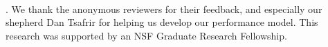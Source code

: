 ~\\
. We thank the anonymous reviewers for their
feedback, and especially our shepherd Dan Tsafrir for helping us develop our
performance model.
This research was supported by an NSF Graduate Research
Fellowship.
